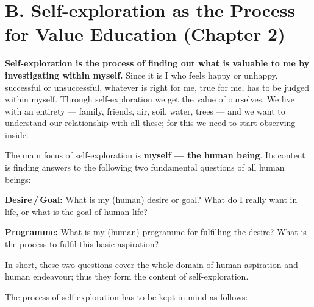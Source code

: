 \section{B. Self-exploration as the Process for Value Education (Chapter 2)}


\ans \textbf{Self-exploration is the process of finding out what is valuable
to me by investigating within myself.} Since it is I who feels happy or
unhappy, successful or unsuccessful, whatever is right for me, true for me,
has to be judged within myself. Through self-exploration we get the value of
ourselves. We live with an entirety --- family, friends, air, soil, water,
trees --- and we want to understand our relationship with all these; for this
we need to start observing inside.

The main focus of self-exploration is \textbf{myself --- the human being}. Its
content is finding answers to the following two fundamental questions of all
human beings:

\begin{apts}
\item \textbf{Desire\,/\,Goal:} What is my (human) desire or goal? What do I
      really want in life, or what is the goal of human life?
\item \textbf{Programme:} What is my (human) programme for fulfilling the
      desire? What is the process to fulfil this basic aspiration?
\end{apts}

In short, these two questions cover the whole domain of human aspiration and
human endeavour; thus they form the content of self-exploration.


\ans The process of self-exploration has to be kept in mind as follows:


